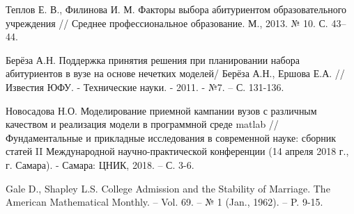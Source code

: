 \begin{thebibliography}{}
	Теплов Е. В., Филинова И. М. Факторы выбора абитуриентом образовательного учреждения // Среднее профессиональное образование. М., 2013. № 10. С. 43–44.

	Берёза А.Н. Поддержка принятия решения при планировании набора абитуриентов в вузе на основе нечетких моделей/ Берёза А.Н., Ершова Е.А. // Известия ЮФУ. - Технические науки. - 2011. - №7. – С. 131-136.

	Новосадова Н.О. Моделирование приемной кампании вузов с различным качеством и реализация модели в программной среде matlab // Фундаментальные и прикладные исследования в современной науке: сборник статей II Международной научно-практической конференции (14 апреля 2018 г., г. Самара). - Самара: ЦНИК, 2018. – С. 3-6.

	Gale D., Shapley L.S. College Admission and the Stability of Marriage. The American Mathematical Monthly. –
	Vol. 69. – № 1 (Jan., 1962). – P. 9-15.

\end{thebibliography}
\endgroup

\pagebreak